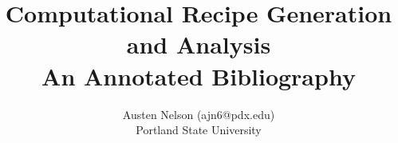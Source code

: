 \documentclass [11pt]{article}
\title{Computational Recipe Generation and Analysis\\\medskip An Annotated Bibliography}
\author{Austen Nelson (ajn6@pdx.edu)\\Portland State University}
\begin{document}
\maketitle
\nocite{*}


\end{document}
